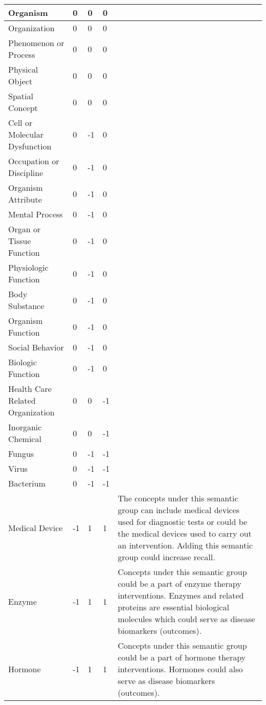 \documentclass[10.7pt,]{article}
\begin{document}
\begin{longtable}{|l|p{0.3cm}|p{0.3cm}|p{0.3cm}|p{7.9cm}|}
        Organism & 0 & 0 & 0 & ~ \\ \hline
        Organization & 0 & 0 & 0 & ~ \\ \hline
        Phenomenon or Process & 0 & 0 & 0 & ~ \\ \hline
        Physical Object & 0 & 0 & 0 & ~ \\ \hline
        Spatial Concept & 0 & 0 & 0 & ~ \\ \hline
        Cell or Molecular Dysfunction & 0 & -1 & 0 & ~ \\ \hline
        Occupation or Discipline & 0 & -1 & 0 & ~ \\ \hline
        Organism Attribute & 0 & -1 & 0 & ~ \\ \hline
        Mental Process & 0 & -1 & 0 & ~ \\ \hline
        Organ or Tissue Function & 0 & -1 & 0 & ~ \\ \hline
        Physiologic Function & 0 & -1 & 0 & ~ \\ \hline
        Body Substance & 0 & -1 & 0 & ~ \\ \hline
        Organism Function & 0 & -1 & 0 & ~ \\ \hline
        Social Behavior & 0 & -1 & 0 & ~ \\ \hline
        Biologic Function & 0 & -1 & 0 & ~ \\ \hline
        Health Care Related Organization & 0 & 0 & -1 & ~ \\ \hline
        Inorganic Chemical & 0 & 0 & -1 & ~ \\ \hline
        Fungus & 0 & -1 & -1 & ~ \\ \hline
        Virus & 0 & -1 & -1 & ~ \\ \hline
        Bacterium & 0 & -1 & -1 & ~ \\ \hline
        Medical Device & -1 & 1 & 1 & The concepts under this semantic group can include medical devices used for diagnostic tests or could be the medical devices used to carry out an intervention. Adding this semantic group could increase recall. \\ \hline
        Enzyme & -1 & 1 & 1 & Concepts under this semantic group could be a part of enzyme therapy interventions. Enzymes and related proteins are essential biological molecules which could serve as disease biomarkers (outcomes). \\ \hline
        Hormone & -1 & 1 & 1 & Concepts under this semantic group could be a part of hormone therapy interventions. Hormones could also serve as disease biomarkers (outcomes). \\ \hline

\end{longtable}
\end{document}
